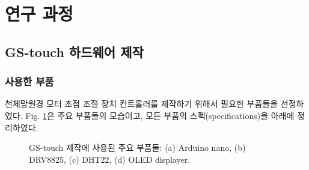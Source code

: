 \section{연구 과정}

\subsection{GS-touch 하드웨어 제작}

\subsubsection{사용한 부품}


천체망원경 모터 초점 조절 장치 컨트롤러를 제작하기 위해서 필요한 부품들을 선정하였다. Fig. \ref{fig:parts}은 주요 부품들의 모습이고, 모든 부품의 스펙(specifications)을 아래에 정리하였다. 

\begin{figure}[h]
	\begin{center}
	\end{center}
	\caption{GS-touch 제작에 사용된 주요 부품들: (a) Arduino nano, (b) DRV8825, (c) DHT22, (d) OLED displayer.}
	\label{fig:parts}
\end{figure}

